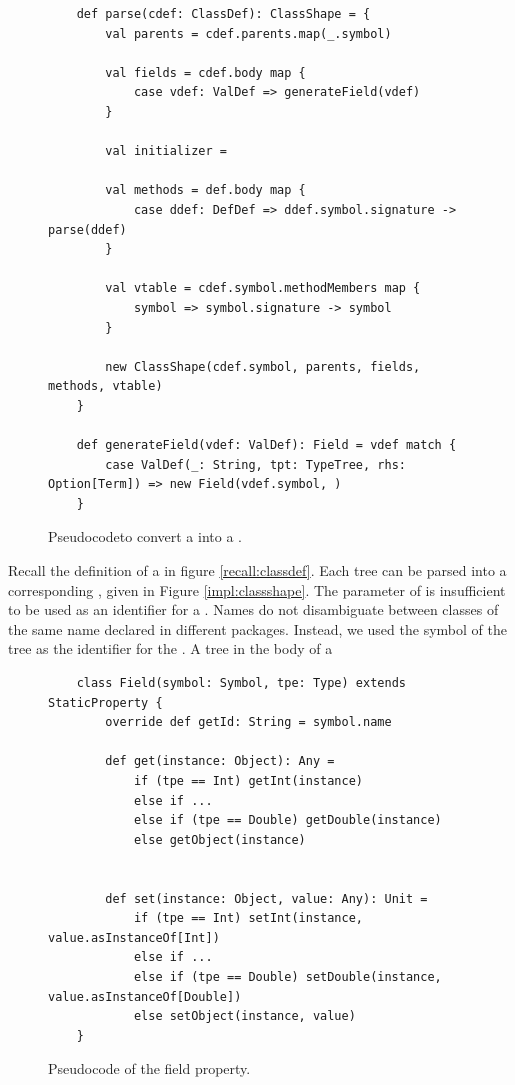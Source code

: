 \begin{figure}[!htb]
	\begin{verbatim}
	def parse(cdef: ClassDef): ClassShape = {
		val parents = cdef.parents.map(_.symbol)
		
		val fields = cdef.body map {
			case vdef: ValDef => generateField(vdef)	
		}
	
		val initializer = 
	
		val methods = def.body map {
			case ddef: DefDef => ddef.symbol.signature -> parse(ddef)
		}
		
		val vtable = cdef.symbol.methodMembers map {
			symbol => symbol.signature -> symbol
		}
	
		new ClassShape(cdef.symbol, parents, fields, methods, vtable)
	}

	def generateField(vdef: ValDef): Field = vdef match {
		case ValDef(_: String, tpt: TypeTree, rhs: Option[Term]) => new Field(vdef.symbol, )
	}
	\end{verbatim}
	\caption{Pseudocodeto convert a  into a .}
	\label{impl:parse-classdef}
\end{figure}


Recall the definition of a  in figure \ref{recall:classdef}.
Each  tree can be parsed into a corresponding , given in Figure \ref{impl:classshape}.
The  parameter of  is insufficient to be used as an identifier for a .
Names do not disambiguate between classes of the same name declared in different packages.
Instead, we used the symbol of the  tree as the identifier for the .
A  tree in the body of a \


\begin{figure}[!htb]
	\begin{verbatim}
	class Field(symbol: Symbol, tpe: Type) extends StaticProperty {
		override def getId: String = symbol.name
			
		def get(instance: Object): Any = 
			if (tpe == Int) getInt(instance)
			else if ...
			else if (tpe == Double) getDouble(instance)
			else getObject(instance)
	
			
		def set(instance: Object, value: Any): Unit = 
			if (tpe == Int) setInt(instance, value.asInstanceOf[Int])
			else if ...
			else if (tpe == Double) setDouble(instance, value.asInstanceOf[Double])
			else setObject(instance, value)	
	} 
	\end{verbatim}
	\caption{Pseudocode of the field property.}
	\label{impl:field}
\end{figure}

